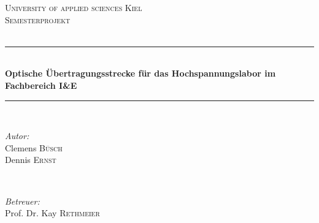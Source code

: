 \begin{titlepage}

\newcommand{\HRule}{\rule{\linewidth}{0.5mm}} %

\center %

\textsc{\LARGE University of applied sciences Kiel}\\[1.5cm] %
\textsc{\Large Semesterprojekt}\\[0.5cm] %
\textsc{\large }\\[0.5cm] %


\HRule \\[0.4cm]
{ \huge \bfseries Optische Übertragungsstrecke für das Hochspannungslabor im Fachbereich I\&E}\\[0.4cm] %
\HRule \\[1.5cm]
 

\begin{minipage}{0.4\textwidth}
\begin{flushleft} \large
\emph{Autor:}\\
Clemens \textsc{Büsch}\\
Dennis \textsc{Ernst}
\end{flushleft}
\end{minipage}
~
\begin{minipage}{0.4\textwidth}
\begin{flushright} \large
\emph{Betreuer:} \\
Prof. Dr. Kay \textsc{Rethmeier} %
\end{flushright}
\end{minipage}\\[2cm]



\end{titlepage}
